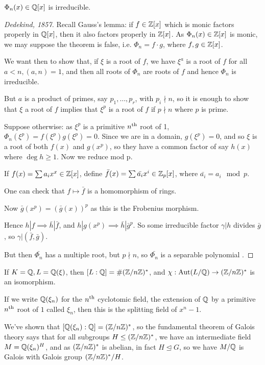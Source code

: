 \documentclass[10pt,a4paper]{article}
\begin{document}
\begin{theorem}
$\Phi_n(x) \in \mathbb{Q}[x]$ is irreducible.
\end{theorem}
\begin{proof}[Dedekind, 1857]
Recall Gauss's lemma: if $f\in \mathbb{Z}[x]$ which is monic factors properly in $\mathbb{Q}[x]$, then it also factors properly in $\mathbb{Z}[x]$. As $\Phi_n(x) \in \mathbb{Z}[x]$ is monic, we may suppose the theorem is false, i.e. $\Phi_n = f\cdot g$, where $f,g \in \mathbb{Z}[x]$.

We want then to show that, if $\xi$ is a root of $f$, we have $\xi^a$ is a root of $f$ for all $a<n, (a,n)=1$, and then all roots of $\Phi_n$ are roots of $f$ and hence $\Phi_n$ is irreducible.

But $a$ is a product of primes, say $p_1, \ldots, p_r$, with $p_i \nmid n$, so it is enough to show that $\xi$ a root of $f$ implies that $\xi^p$ is a root of $f$ if $p\nmid n$ where $p$ is prime.

Suppose otherwise: as $\xi^p$ is a primitive $n\textsuperscript{th}$ root of 1, $\Phi_n(\xi^p) = f(\xi^p)g(\xi^p) = 0$. Since we are in a domain, $g(\xi^p) = 0$, and so $\xi$ is a root of both $f(x)$ and $g(x^p)$, so they have a common factor of say $h(x)$ where $\deg h \geq 1$. Now we reduce mod p.

If $f(x) = \sum a_i x^x \in \mathbb{Z}[x]$, define $\bar{f}(x) = \sum \bar{a_i}x^i \in \mathbb{Z}_p[x]$, where $\bar{a_i} = a_i \mod p$.

One can check that $f \mapsto \bar{f}$ is a homomorphism of rings.

Now $\bar{g}(x^p) = (\bar{g}(x))^p$ as this is the Frobenius morphism.

Hence $h|f \implies \bar{h}|\bar{f}$, and $h|g(x^p) \implies \bar{h}|\bar{g}^p$. So some irreducible factor $\gamma |h$ divides $\bar{g}$, so $\gamma|(\bar{f},\bar{g})$.

But then $\bar{\Phi_n}$ has a multiple root, but $p\nmid n$, so $\bar{\Phi_n}$ is a separable polynomial \contr.
\end{proof}
\begin{corollary}
If $K=\mathbb{Q}, L=\mathbb{Q}(\xi)$, then $[L:\mathbb{Q}] = \#(\mathbb{Z}/n\mathbb{Z})^{\ast}$, and $\chi:\operatorname{Aut}(L/\mathbb{Q}) \to (\mathbb{Z}/n\mathbb{Z})^{\ast}$ is an isomorphism.
\end{corollary}
If we write $\mathbb{Q}(\xi_n)$ for the $n\textsuperscript{th}$ cyclotomic field, the extension of $\mathbb{Q}$ by a primitive $n\textsuperscript{th}$ root of $1$ called $\xi_n$, then this is the splitting field of $x^n-1$.

We've shown that $[\mathbb{Q}(\xi_n):\mathbb{Q}] = (\mathbb{Z}/n\mathbb{Z})^{\ast}$, so the fundamental theorem of Galois theory says that for all subgroups $H \leq (\mathbb{Z}/n\mathbb{Z})^{\ast}$, we have an intermediate field $M = \mathbb{Q}(\xi_n)^H$, and as $(\mathbb{Z}/n\mathbb{Z})^{\ast}$ is abelian, in fact $H \trianglelefteq G$, so we have $M/\mathbb{Q}$ is Galois with Galois group $(\mathbb{Z}/n\mathbb{Z})^{\ast}/H$.
\end{document}
